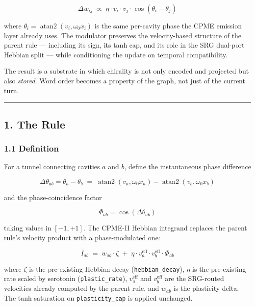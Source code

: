 \documentclass[
  11pt,
  a4paper,
]{article}
\begin{document}
\[
\Delta w_{ij} \;\propto\; \eta \cdot v_i \cdot v_j \cdot \cos(\theta_i - \theta_j)
\]

where \(\theta_i = \operatorname{atan2}(v_i, \omega_0 x_i)\) is the same
per-cavity phase the CPME emission layer already uses. The modulator
preserves the velocity-based structure of the parent rule --- including
its sign, its tanh cap, and its role in the SRG dual-port Hebbian split
--- while conditioning the update on temporal compatibility.

The result is a substrate in which chirality is not only encoded and
projected but also \emph{stored}. Word order becomes a property of the
graph, not just of the current turn.

\begin{center}\rule{0.5\linewidth}{0.5pt}\end{center}

\subsection{1. The Rule}\label{the-rule}

\subsubsection{1.1 Definition}\label{definition}

For a tunnel connecting cavities \(a\) and \(b\), define the
instantaneous phase difference

\[
\Delta \theta_{ab} = \theta_a - \theta_b \;=\; \operatorname{atan2}(v_a, \omega_0 x_a) - \operatorname{atan2}(v_b, \omega_0 x_b)
\]

and the phase-coincidence factor

\[
\Phi_{ab} = \cos(\Delta \theta_{ab})
\]

taking values in \([-1, +1]\). The CPME-II Hebbian integrand replaces
the parent rule's velocity product with a phase-modulated one:

\[
I_{ab} \;=\; w_{ab} \cdot \zeta \;+\; \eta \cdot v_a^{\text{eff}} \cdot v_b^{\text{eff}} \cdot \Phi_{ab}
\]

where \(\zeta\) is the pre-existing Hebbian decay
(\texttt{hebbian\_decay}), \(\eta\) is the pre-existing rate scaled by
serotonin (\texttt{plastic\_rate}), \(v_a^{\text{eff}}\) and
\(v_b^{\text{eff}}\) are the SRG-routed velocities already computed by
the parent rule, and \(w_{ab}\) is the plasticity delta. The tanh
saturation on \texttt{plasticity\_cap} is applied unchanged.
\end{document}
